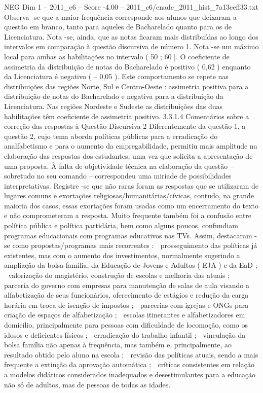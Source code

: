 \begin{textsample}{NEG Dim 1 – 2011\_c6 – Score -4.00 – 2011\_c6/enade\_2011\_hist\_7a13ceff33.txt}
Observa -se que a maior frequência corresponde aos alunos que deixaram a questão em branco, tanto para aqueles de Bacharelado quanto para os de Licenciatura.
Nota -se, ainda, que as notas ficaram mais distribuídas ao longo dos intervalos em comparação à questão discursiva de número 1.
Nota -se um máximo local para ambas as habilitações no intervalo ( 50 ; 60 ].
O coeficiente de assimetria da distribuição de notas do Bacharelado é positivo ( 0,62 ) enquanto da Licenciatura é negativo ( – 0,05 ).
Este comportamento se repete nas distribuições das regiões Norte, Sul e Centro-Oeste : assimetria positiva para a distribuição de notas do Bacharelado e negativa para a distribuição da Licenciatura.
Nas regiões Nordeste e Sudeste as distribuições das duas habilitações têm coeficiente de assimetria positivo. 3.3.1.4 Comentários sobre a correção das respostas à Questão Discursiva 2 Diferentemente da questão 1, a questão 2, cujo tema aborda políticas públicas para a erradicação do analfabetismo e para o aumento da empregabilidade, permitiu mais amplitude na elaboração das respostas dos estudantes, uma vez que solicita a apresentação de uma proposta.
À falta de objetividade técnica na elaboração da questão – sobretudo no seu comando – correspondeu uma miríade de possibilidades interpretativas.
Registre -se que não raras foram as respostas que se utilizaram de lugares comuns e exortações religiosas/humanitárias/cívicas, contudo, na grande maioria dos casos, essas exortações foram usadas como um encerramento do texto e não comprometeram a resposta.
Muito frequente também foi a confusão entre política pública e política partidária, bem como alguns poucos, confundiam programas educacionais com programas educativos nas TVs.
Assim, destacaram -se como propostas/programas mais recorrentes :  prosseguimento das políticas já existentes, mas com o aumento dos investimentos, normalmente sugerindo a ampliação da bolsa família, da Educação de Jovens e Adultos ( EJA ) e da EaD ;  valorização do magistério, construção de escolas e melhoria das atuais ;  parceria do governo com empresas para manutenção de salas de aula visando a alfabetização de seus funcionários, oferecimento de estágios e redução da carga horária em troca de isenção de impostos ;  parcerias com igrejas e ONGs para criação de espaços de alfabetização ;  escolas itinerantes e alfabetizadores em domicílio, principalmente para pessoas com dificuldade de locomoção, como os idosos e deficientes físicos ;  erradicação do trabalho infantil ;  vinculação da bolsa família não apenas à frequência, mas também e, principalmente, ao resultado obtido pelo aluno na escola ;  revisão das políticas atuais, sendo a mais frequente a extinção da aprovação automática ;  críticas consistentes em relação a modelos didáticos considerados inadequados e desestimulantes para a educação não só de adultos, mas de pessoas de todas as idades.

\end{textsample}
